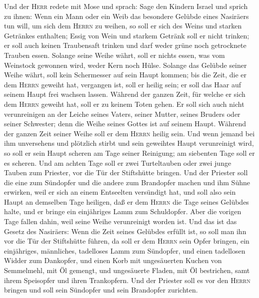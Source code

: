 Und der \textsc{Herr} redete mit Mose und sprach: Sage
den Kindern Israel und sprich zu ihnen:  Wenn ein Mann
oder ein Weib das besondere Gelübde eines Nasiräers tun will, um sich
dem \textsc{Herrn} zu weihen,  so soll er sich des Weins
und starken Getränkes enthalten; Essig von Wein und starkem Getränk soll
er nicht trinken; er soll auch keinen Traubensaft trinken und darf weder
grüne noch getrocknete Trauben essen.  Solange seine Weihe
währt, soll er nichts essen, was vom Weinstock gewonnen wird, weder Kern
noch Hülse. Solange das Gelübde seiner Weihe währt, soll kein
Schermesser auf sein Haupt kommen;  bis die Zeit, die er
dem \textsc{Herrn} geweiht hat, vergangen ist, soll er heilig sein; er
soll das Haar auf seinem Haupt frei wachsen lassen. 
Während der ganzen Zeit, für welche er sich dem \textsc{Herrn} geweiht
hat, soll er zu keinem Toten gehen.  Er soll sich auch
nicht verunreinigen an der Leiche seines Vaters, seiner Mutter, seines
Bruders oder seiner Schwester; denn die Weihe seines Gottes ist auf
seinem Haupt.  Während der ganzen Zeit seiner Weihe soll
er dem \textsc{Herrn} heilig sein.  Und wenn jemand bei
ihm unversehens und plötzlich stirbt und sein geweihtes Haupt
verunreinigt wird, so soll er sein Haupt scheren am Tage seiner
Reinigung; am siebenten Tage soll er es scheren.  Und am
achten Tage soll er zwei Turteltauben oder zwei junge Tauben zum
Priester, vor die Tür der Stiftshütte bringen.  Und der
Priester soll die eine zum Sündopfer und die andere zum Brandopfer
machen und ihm Sühne erwirken, weil er sich an einem Entseelten
versündigt hat, und soll also sein Haupt an demselben Tage heiligen,
 daß er dem \textsc{Herrn} die Tage seines Gelübdes
halte, und er bringe ein einjähriges Lamm zum Schuldopfer. Aber die
vorigen Tage fallen dahin, weil seine Weihe verunreinigt worden ist.
 Und das ist das Gesetz des Nasiräers: Wenn die Zeit
seines Gelübdes erfüllt ist, so soll man ihn vor die Tür der Stiftshütte
führen,  da soll er dem \textsc{Herrn} sein Opfer
bringen, ein einjähriges, männliches, tadelloses Lamm zum Sündopfer, und
einen tadellosen Widder zum Dankopfer,  und einen Korb
mit ungesäuerten Kuchen von Semmelmehl, mit Öl gemengt, und ungesäuerte
Fladen, mit Öl bestrichen, samt ihrem Speisopfer und ihren Trankopfern.
 Und der Priester soll es vor den \textsc{Herrn} bringen
und soll sein Sündopfer und sein Brandopfer zurichten. 
